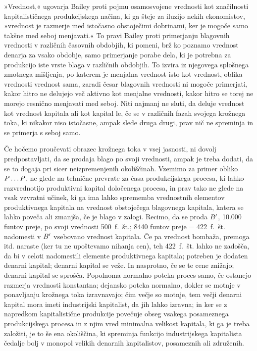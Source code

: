 \documentclass[kapital_02.tex]{subfiles}
\begin{document}
»Vrednost,« ugovarja Bailey proti pojmu osamosvojene vrednosti kot značilnosti kapitalističnega produkcijskega načina, ki ga šteje za iluzijo nekih ekonomistov, »vrednost je \KPEstran razmerje med istočasno obstoječimi dobrinami, ker je mogoče samo takšne med seboj menjavati.« To pravi Bailey proti primerjanju blagovnih vrednosti v različnih časovnih obdobjih, ki pomeni, brž ko poznamo vrednost denarja za vsako obdobje, samo primerjanje porabe dela, ki je potrebna za produkcijo iste vrste blaga v različnih obdobjih. To izvira iz njegovega splošnega zmotnega mišljenja, po katerem je menjalna vrednost isto kot vrednost, oblika vrednosti vrednost sama, zaradi česar blagovnih vrednosti ni mogoče primerjati, kakor hitro ne delujejo več aktivno kot menjalne vrednosti, kakor hitro se torej ne morejo resnično menjavati med seboj. Niti najmanj ne sluti, da deluje vrednost kot vrednost kapitala ali kot kapital le, če se v različnih fazah svojega krožnega toka, ki nikakor niso istočasne, ampak slede druga drugi, prav nič ne spreminja in se primerja s seboj samo.

Če hočemo proučevati obrazec krožnega toka v vsej jasnosti, ni dovolj predpostavljati, da se prodaja blago po svoji vrednosti, ampak je treba dodati, da se to dogaja pri sicer neizpremenjenih okoliščinah. Vzemimo za primer obliko \( P \dots P \), ne glede na tehnične prevrate za časa produkcijskega procesa, ki lahko razvrednotijo produktivni kapital določenega procesa, in prav tako ne glede na vsak vzvratni učinek, ki ga ima lahko sprememba vrednostnih elementov produktivnega kapitala na vrednost obstoječega blagovnega kapitala, katera se lahko poveča ali zmanjša, če je blago v zalogi. Recimo, da se proda \( B' \), 10.000 funtov preje, po svoji vrednosti 500\ f.\ št.; 8440 funtov preje = 422\ f.\ št. nadomesti v \( B' \) vsebovano vrednost kapitala. Če pa vrednost bombaža, premoga itd. naraste (ker tu ne upoštevamo nihanja cen), teh 422\ f.\ št. lahko ne zadošča, da bi v celoti nadomestili elemente produktivnega kapitala; potreben je dodaten denarni kapital; denarni kapital se veže. In nasprotno, če se te cene znižajo; denarni kapital se sprošča. Popolnoma normalno poteka proces samo, če ostanejo razmerja vrednosti konstantna; dejansko poteka normalno, dokler se motnje v ponavljanju krožnega toka izravnavajo; čim večje so motnje, tem večji denarni kapital mora imeti \KPEstran industrijski kapitalist, da jih lahko izravna; in ker se z napredkom kapitalistične produkcije povečuje obseg vsakega posameznega produkcijskega procesa in z njim vred minimalna velikost kapitala, ki ga je treba založiti, je to še ena okoliščina, ki spreminja funkcijo industrijskega kapitalista čedalje bolj v monopol velikih denarnih kapitalistov, posameznih ali združenih.
\end{document}

